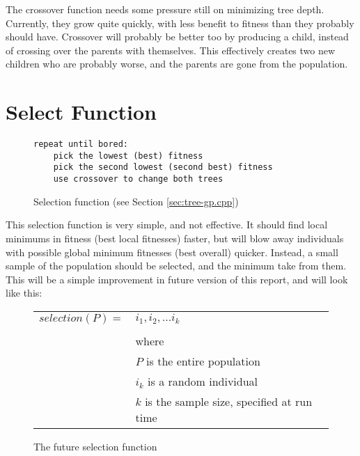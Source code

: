\documentclass[12pt]{article}
\begin{document}
The crossover function needs some pressure still on minimizing tree depth. Currently, they grow quite quickly, with less benefit to fitness than they probably should have. Crossover will probably be better too by producing a child, instead of crossing over the parents with themselves. This effectively creates two new children who are probably worse, and the parents are gone from the population.

\section{Select Function}
\begin{figure}[!h]
        \begin{center}
		\begin{lstlisting}
repeat until bored:
	pick the lowest (best) fitness
	pick the second lowest (second best) fitness
	use crossover to change both trees
		\end{lstlisting}
               \caption{Selection function (see Section \ref{sec:tree-gp.cpp})}
                \label{selection}
        \end{center}
\end{figure}

This selection function is very simple, and not effective. It should find local minimums in fitness (best local fitnesses) faster, but will blow away individuals with possible global minimum fitnesses (best overall) quicker. Instead, a small sample of the population should be selected, and the minimum take from them. This will be a simple improvement in future version of this report, and will look like this:
\begin{figure}[!h]
        \begin{center}
		\begin{tabular}{r l}
			$ selection(P) = $		&	$ i_1, i_2, ... i_k$ \\
								& \\
								&	where \\
								&	$ P $ is the entire population \\
								&	$ i_k $ is a random individual \\
								&	$ k $ is the sample size, specified at run time \\
		\end{tabular} 
               \caption{The future selection function}
                \label{selection_future}
        \end{center}
\end{figure}
\end{document}
